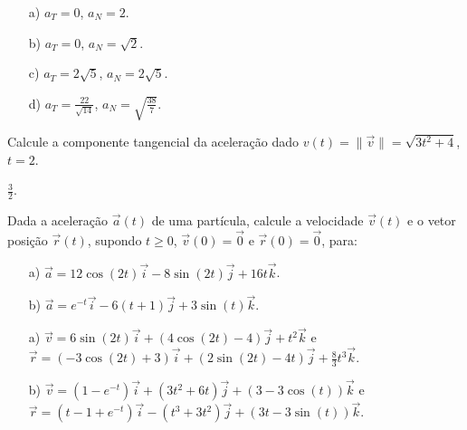 \begin{resp}
\begin{itemize}
 \item[a)] $a_T=0$, $a_N=2$.
 \item[b)] $a_T=0$, $a_N=\sqrt{2}$.
 \item[c)] $a_T=2\sqrt{5}$, $a_N=2\sqrt{5}$.
 \item[d)] $a_T=\frac{22}{\sqrt{14}}$, $a_N=\sqrt{\frac{38}{7}}$.
\end{itemize}
 
\end{resp}
\begin{exer} Calcule a componente tangencial da aceleração dado $v(t) = \|\vec{v}\| = \sqrt{3t^2+4}$, $t=2$.
\end{exer}
\begin{resp}
 $\frac{3}{2}$.
\end{resp}


\begin{exer} Dada a aceleração $\vec{a}(t)$ de uma partícula, calcule a velocidade $\vec{v}(t)$ e o vetor posição $\vec{r}(t)$, supondo $t\geq 0$, $\vec{v}(0)=\vec{0}$ e  $\vec{r}(0)=\vec{0}$, para:
\begin{itemize}
 \item[a)] $\vec{a}=12\cos(2t)\vec{i}-8\sin(2t)\vec{j}+16t\vec{k}$.
 \item[b)] $\vec{a}=e^{-t}\vec{i}-6(t+1)\vec{j}+3\sin(t)\vec{k}$. 
\end{itemize}
\end{exer}
\begin{resp}
\begin{itemize}
 \item[a)] $\vec{v}=6\sin(2t)\vec{i}+(4\cos(2t)-4)\vec{j}+t^2\vec{k}$ e $\vec{r}=(-3\cos(2t)+3)\vec{i}+(2\sin(2t)-4t)\vec{j}+\frac{8}{3}t^3\vec{k}$.
  \item[b)] $\vec{v}=(1-e^{-t})\vec{i}+(3t^2+6t)\vec{j}+(3-3\cos(t))\vec{k}$ e $\vec{r}=(t-1+e^{-t})\vec{i}-(t^3+3t^2)\vec{j}+(3t-3\sin(t))\vec{k}$.
\end{itemize}
\end{resp}



